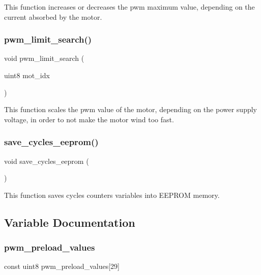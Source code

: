 This function increases or decreases the pwm maximum value, depending on the current absorbed by the motor. \mbox{\label{interruptions_8c_ac7305eeb40ebfb2c0d67725aa2e88f78}} 
\subsubsection{pwm\+\_\+limit\+\_\+search()}
{\footnotesize\ttfamily void pwm\+\_\+limit\+\_\+search (\begin{DoxyParamCaption}\item[{uint8}]{mot\+\_\+idx }\end{DoxyParamCaption})}

This function scales the pwm value of the motor, depending on the power supply voltage, in order to not make the motor wind too fast. \mbox{\label{interruptions_8c_ad86170580c30277d97216739e8508a13}} 
\subsubsection{save\+\_\+cycles\+\_\+eeprom()}
{\footnotesize\ttfamily void save\+\_\+cycles\+\_\+eeprom (\begin{DoxyParamCaption}{ }\end{DoxyParamCaption})}

This function saves cycles counters variables into E\+E\+P\+R\+OM memory. 

\subsection{Variable Documentation}
\mbox{\label{interruptions_8c_aee1865719263cf20251f918e8825703d}} 
\subsubsection{pwm\+\_\+preload\+\_\+values}
{\footnotesize\ttfamily const uint8 pwm\+\_\+preload\+\_\+values[29]\hspace{0.3cm}{\ttfamily [static]}}

